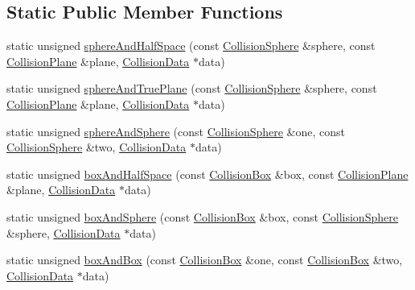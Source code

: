 \subsection*{Static Public Member Functions}
\begin{DoxyCompactItemize}
\item 
static unsigned \mbox{\hyperlink{classrum_1_1_collision_detector_old_afc207ecbfe631676d86a8daea4735243}{sphere\+And\+Half\+Space}} (const \mbox{\hyperlink{classrum_1_1_collision_sphere}{Collision\+Sphere}} \&sphere, const \mbox{\hyperlink{classrum_1_1_collision_plane}{Collision\+Plane}} \&plane, \mbox{\hyperlink{classrum_1_1_collision_data}{Collision\+Data}} $\ast$data)
\item 
static unsigned \mbox{\hyperlink{classrum_1_1_collision_detector_old_ab1aae557723a05e722e11c6f83f2e4f2}{sphere\+And\+True\+Plane}} (const \mbox{\hyperlink{classrum_1_1_collision_sphere}{Collision\+Sphere}} \&sphere, const \mbox{\hyperlink{classrum_1_1_collision_plane}{Collision\+Plane}} \&plane, \mbox{\hyperlink{classrum_1_1_collision_data}{Collision\+Data}} $\ast$data)
\item 
static unsigned \mbox{\hyperlink{classrum_1_1_collision_detector_old_a886afe59650dc1a0c3272855e27cd4a6}{sphere\+And\+Sphere}} (const \mbox{\hyperlink{classrum_1_1_collision_sphere}{Collision\+Sphere}} \&one, const \mbox{\hyperlink{classrum_1_1_collision_sphere}{Collision\+Sphere}} \&two, \mbox{\hyperlink{classrum_1_1_collision_data}{Collision\+Data}} $\ast$data)
\item 
static unsigned \mbox{\hyperlink{classrum_1_1_collision_detector_old_a3071b8810cea5baece95f9d3f90e0a0a}{box\+And\+Half\+Space}} (const \mbox{\hyperlink{classrum_1_1_collision_box}{Collision\+Box}} \&box, const \mbox{\hyperlink{classrum_1_1_collision_plane}{Collision\+Plane}} \&plane, \mbox{\hyperlink{classrum_1_1_collision_data}{Collision\+Data}} $\ast$data)
\item 
static unsigned \mbox{\hyperlink{classrum_1_1_collision_detector_old_abddbc64dde369508429cf2d5867d2030}{box\+And\+Sphere}} (const \mbox{\hyperlink{classrum_1_1_collision_box}{Collision\+Box}} \&box, const \mbox{\hyperlink{classrum_1_1_collision_sphere}{Collision\+Sphere}} \&sphere, \mbox{\hyperlink{classrum_1_1_collision_data}{Collision\+Data}} $\ast$data)
\item 
static unsigned \mbox{\hyperlink{classrum_1_1_collision_detector_old_ae97d166405110949929135e51d858150}{box\+And\+Box}} (const \mbox{\hyperlink{classrum_1_1_collision_box}{Collision\+Box}} \&one, const \mbox{\hyperlink{classrum_1_1_collision_box}{Collision\+Box}} \&two, \mbox{\hyperlink{classrum_1_1_collision_data}{Collision\+Data}} $\ast$data)
\end{DoxyCompactItemize}


